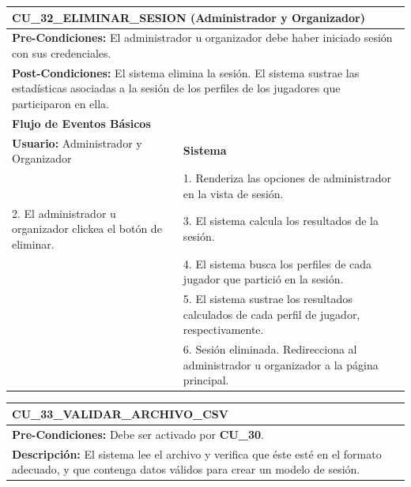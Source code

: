 \begin{center}
  \begin{tabular}{| p{7.5cm} | p{7.5cm} |}
    \hline
    \multicolumn{2}{|p{15cm}|}{\textbf{CU\_32\_ELIMINAR\_SESION} (Administrador y Organizador)} \\ \hline
    \multicolumn{2}{|p{15cm}|}{\textbf{Pre-Condiciones:} El administrador u organizador debe haber iniciado sesión con sus credenciales.} \\ \hline
    \multicolumn{2}{|p{15cm}|}{\textbf{Post-Condiciones:} El sistema elimina la sesión. El sistema sustrae las estadísticas asociadas a la sesión de los perfiles de los jugadores que participaron en ella.} \\ \hline
    \multicolumn{2}{|p{7.5cm}|}{\textbf{Flujo de Eventos Básicos}} \\ \hline
    \multicolumn{1}{|p{7.5cm}|}{\textbf{Usuario:} Administrador y Organizador} & \multicolumn{1}{|p{7.5cm}|}{\textbf{Sistema}} \\ \hline
    
    \multicolumn{1}{|p{7.5cm}|}{} & 
    \multicolumn{1}{|p{7.5cm}|}{1. Renderiza las opciones de administrador en la vista de sesión.}\\ \hline
    
    \multicolumn{1}{|p{7.5cm}|}{2. El administrador u organizador clickea el botón de eliminar.}& 
    \multicolumn{1}{|p{7.5cm}|}{3. El sistema calcula los resultados de la sesión.}\\ \hline
    
    \multicolumn{1}{|p{7.5cm}|}{} & 
    \multicolumn{1}{|p{7.5cm}|}{4. El sistema busca los perfiles de cada jugador que partició en la sesión.}\\ \hline
    
    \multicolumn{1}{|p{7.5cm}|}{} & 
    \multicolumn{1}{|p{7.5cm}|}{5. El sistema sustrae los resultados calculados de cada perfil de jugador, respectivamente.}\\ \hline
    
    \multicolumn{1}{|p{7.5cm}|}{} & 
    \multicolumn{1}{|p{7.5cm}|}{6. Sesión eliminada. Redirecciona al administrador u organizador a la página principal.}\\ \hline
  \end{tabular}
\end{center}

\begin{center}
  \begin{tabular}{| p{7.5cm} | p{7.5cm} |}
    \hline
    \multicolumn{2}{|p{15cm}|}{\textbf{CU\_33\_VALIDAR\_ARCHIVO\_CSV}} \\ \hline
    \multicolumn{2}{|p{15cm}|}{\textbf{Pre-Condiciones:} Debe ser activado por \textbf{CU\_30}.} \\ \hline
    \multicolumn{2}{|p{15cm}|}{\textbf{Descripción:} El sistema lee el archivo y verifica que éste esté en el formato adecuado, y que contenga datos válidos para crear un modelo de sesión.} \\
    \hline
  \end{tabular}
\end{center}

